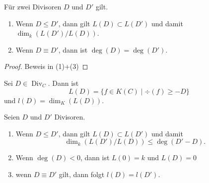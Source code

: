 \begin{proposition}\label{prop:Gleichheit-zwei-Divisoren}
  Für zwei Divisoren $D$ und $D'$ gilt.
  \begin{enumerate}
    \item Wenn $D\leq D'$, dann gilt $L(D)\subset L(D')$ und damit \(\dim_k(L(D')/L(D))\).
    \item Wenn $D\equiv D'$, dann ist $\deg(D)=\deg(D')$.
  \end{enumerate}
\end{proposition}
\begin{proof}
  Beweis in \cite[S.98]{Fuelton08} (1)+(3)
\end{proof}
Sei $D\in\operatorname{Div}_C$. Dann ist
\[
  L(D)=\{f\in K(C)\mid \div(f)\geq -D\}
\]
und $l(D)=\dim_K(L(D))$.
\begin{proposition}\label{prop:l(d)-endlich}
  Seien $D$ und $D'$ Divisoren.
  \begin{enumerate}
    \item Wenn $D\leq D'$, dann gilt $L(D)\subset L(D')$ und damit
          \[
            \dim_k(L(D')/L(D))\leq \deg(D'-D).
          \]
    \item Wenn $\deg(D)<0$, dann ist $L(0)=k$ und $L(D)=0$
    \item wenn $D\equiv D'$ gilt, dann folgt $l(D)=l(D')$.
  \end{enumerate}
\end{proposition}
